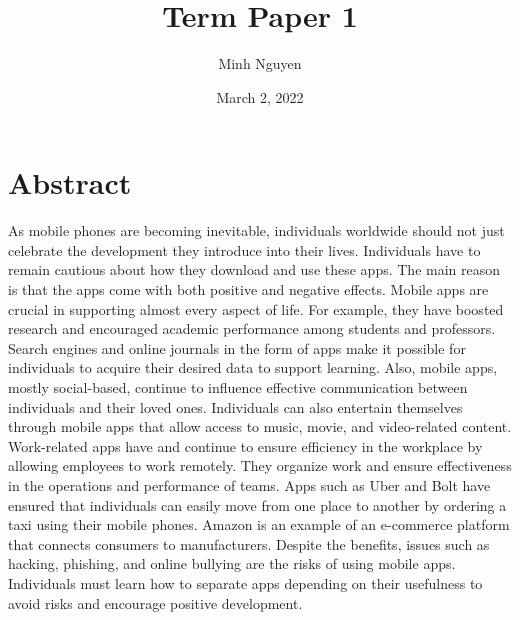 \documentclass{article}
\title{Term Paper 1}
\author{Minh Nguyen}
\date{March 2, 2022}
\begin{document}
\maketitle

\section*{Abstract}
As mobile phones are becoming inevitable, individuals worldwide should not just celebrate the development they introduce into their lives. Individuals have to remain cautious about how they download and use these apps. The main reason is that the apps come with both positive and negative effects. Mobile apps are crucial in supporting almost every aspect of life. For example, they have boosted research and encouraged academic performance among students and professors. Search engines and online journals in the form of apps make it possible for individuals to acquire their desired data to support learning. Also, mobile apps, mostly social-based, continue to influence effective communication between individuals and their loved ones. Individuals can also entertain themselves through mobile apps that allow access to music, movie, and video-related content. Work-related apps have and continue to ensure efficiency in the workplace by allowing employees to work remotely. They organize work and ensure effectiveness in the operations and performance of teams. Apps such as Uber and Bolt have ensured that individuals can easily move from one place to another by ordering a taxi using their mobile phones. Amazon is an example of an e-commerce platform that connects consumers to manufacturers. Despite the benefits, issues such as hacking, phishing, and online bullying are the risks of using mobile apps. Individuals must learn how to separate apps depending on their usefulness to avoid risks and encourage positive development.

\medskip
\end{document}
